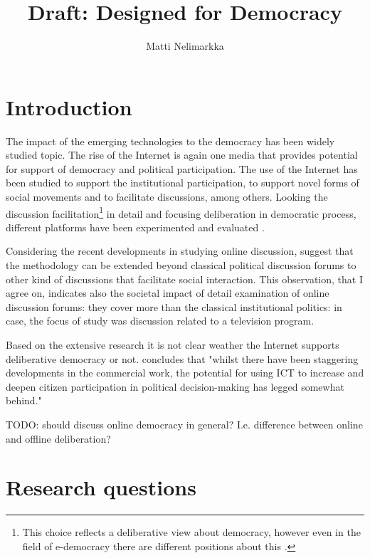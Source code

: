 \documentclass[journal,a4paper]{IEEEtran}
\author{Matti Nelimarkka}
\title{Draft: Designed for Democracy}
\begin{document}
\maketitle

\setlength{\parindent}{0pt}
\setlength{\parskip}{1ex}


\section{Introduction}

The impact of the emerging technologies to the democracy has been widely studied topic. The rise of the Internet is again one media that provides potential for support of democracy and political participation. The use of the Internet has been studied to support the institutional participation, to support novel forms of social movements and to facilitate discussions, among others. Looking the discussion facilitation\footnote{This choice reflects a deliberative view about democracy, however even in the field of e-democracy there are different positions about this .} in detail and focusing deliberation in democratic process, different platforms have been experimented  and evaluated .

Considering the recent developments in studying online discussion,  suggest that the methodology can be extended beyond classical political discussion forums to other kind of discussions that facilitate social interaction. This observation, that I agree on, indicates also the societal impact of detail examination of online discussion forums: they cover more than the classical institutional politics: in  case, the focus of study was discussion related to a television program.

Based on the extensive research it is not clear weather the Internet supports deliberative democracy or not.  concludes that "whilst there have been staggering developments in the commercial work, the potential for using ICT to increase and deepen citizen participation in political decision-making has legged somewhat behind."

TODO: should discuss online democracy in general? I.e. difference between online and offline deliberation?

\section{Research questions}
\end{document}
